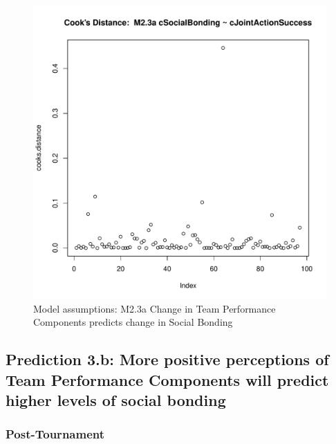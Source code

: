 {\begin{figure}[htbp]
        \includegraphics[scale =.4]{images/MLM23aCooksD.pdf}
        \caption{Model assumptions: M2.3a Change in Team Performance Components predicts change in Social Bonding}
        \label{fig:MLM23aAssumptions}
      \end{figure}







      \subsection{Prediction 3.b: More positive perceptions of Team Performance Components will predict higher levels of social bonding}

      \subsubsection{Post-Tournament}

          
          \restoregeometry



}
